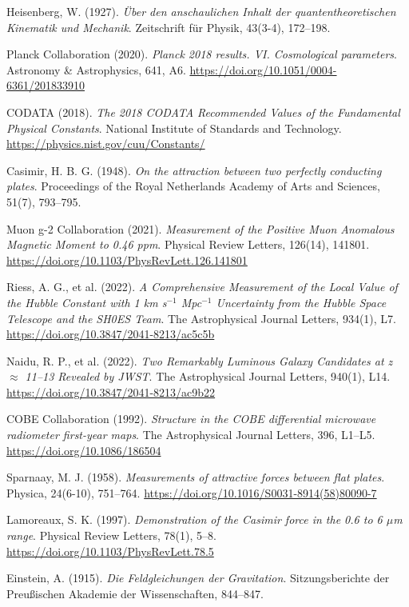\documentclass[12pt,a4paper]{article}
\begin{document}
\begin{thebibliography}{20}
		Heisenberg, W. (1927). 
		\textit{\"Uber den anschaulichen Inhalt der quantentheoretischen Kinematik und Mechanik}. 
		Zeitschrift f\"ur Physik, 43(3-4), 172--198.
		
		Planck Collaboration (2020). 
		\textit{Planck 2018 results. VI. Cosmological parameters}. 
		Astronomy \& Astrophysics, 641, A6. 
		\url{https://doi.org/10.1051/0004-6361/201833910}
		
		CODATA (2018). 
		\textit{The 2018 CODATA Recommended Values of the Fundamental Physical Constants}. 
		National Institute of Standards and Technology. 
		\url{https://physics.nist.gov/cuu/Constants/}
		
		Casimir, H. B. G. (1948). 
		\textit{On the attraction between two perfectly conducting plates}. 
		Proceedings of the Royal Netherlands Academy of Arts and Sciences, 51(7), 793--795.
		
		Muon g-2 Collaboration (2021). 
		\textit{Measurement of the Positive Muon Anomalous Magnetic Moment to 0.46 ppm}. 
		Physical Review Letters, 126(14), 141801. 
		\url{https://doi.org/10.1103/PhysRevLett.126.141801}
		
		Riess, A. G., et al. (2022). 
		\textit{A Comprehensive Measurement of the Local Value of the Hubble Constant with 1 km s$^{-1}$ Mpc$^{-1}$ Uncertainty from the Hubble Space Telescope and the SH0ES Team}. 
		The Astrophysical Journal Letters, 934(1), L7. 
		\url{https://doi.org/10.3847/2041-8213/ac5c5b}
		
		Naidu, R. P., et al. (2022). 
		\textit{Two Remarkably Luminous Galaxy Candidates at z $\approx$ 11--13 Revealed by JWST}. 
		The Astrophysical Journal Letters, 940(1), L14. 
		\url{https://doi.org/10.3847/2041-8213/ac9b22}
		
		COBE Collaboration (1992). 
		\textit{Structure in the COBE differential microwave radiometer first-year maps}. 
		The Astrophysical Journal Letters, 396, L1--L5. 
		\url{https://doi.org/10.1086/186504}
		
		Sparnaay, M. J. (1958). 
		\textit{Measurements of attractive forces between flat plates}. 
		Physica, 24(6-10), 751--764. 
		\url{https://doi.org/10.1016/S0031-8914(58)80090-7}
		
		Lamoreaux, S. K. (1997). 
		\textit{Demonstration of the Casimir force in the 0.6 to 6 $\mu$m range}. 
		Physical Review Letters, 78(1), 5--8. 
		\url{https://doi.org/10.1103/PhysRevLett.78.5}
		
		Einstein, A. (1915). 
		\textit{Die Feldgleichungen der Gravitation}. 
		Sitzungsberichte der Preußischen Akademie der Wissenschaften, 844--847.
		
	\end{thebibliography}
	
\end{document}
